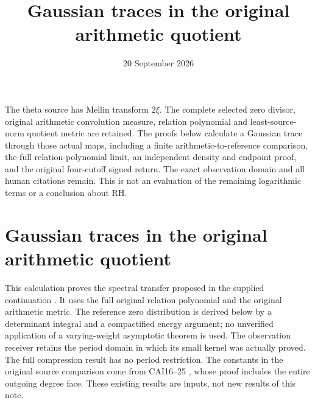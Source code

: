 \documentclass[11pt]{article}
\title{Gaussian traces in the original arithmetic quotient}
\author{}\date{20 September 2026}
\begin{document}
\maketitle
The theta source has Mellin transform $2\xi$. The complete selected
zero divisor, original arithmetic convolution measure, relation
polynomial and least-source-norm quotient metric are retained.
The proofs below calculate a Gaussian trace through those actual
maps, including a finite arithmetic-to-reference comparison,
the full relation-polynomial limit, an independent density and
endpoint proof, and the original four-cutoff signed return.
The exact observation domain and all human citations remain.
This is not an evaluation of the remaining logarithmic terms or
a conclusion about RH.


\clearpage\begingroup
\part*{Gaussian traces in the original arithmetic quotient}
\newcommand{\garnativeR}{\mathbb R}\newcommand{\garnativeC}{\mathbb C}
\newcommand{\garnativePP}{\mathcal P}\newcommand{\garnativedd}{\,d}
\newcommand{\garnativenorm}[1]{\left\lVert#1\right\rVert}
\newcommand{\garnativeTr}{\operatorname{Tr}}\newcommand{\garnativerank}{\operatorname{rank}}
\newtheorem{garnativetheorem}{Theorem}\newtheorem{garnativelemma}[garnativetheorem]{Lemma}


This calculation proves the spectral transfer proposed in the supplied
continuation \cite{garnative:incoming}. It uses the full original relation polynomial
and the original arithmetic metric. The reference zero distribution is
derived below by a determinant integral and a compactified energy argument;
no unverified application of a varying-weight asymptotic theorem is used.
The observation receiver retains the period domain in which its small
kernel was actually proved. The full compression result has no period
restriction. The constants in the original source comparison come from
CAI16--25 \cite{garnative:cumulative}, whose proof includes the entire outgoing degree
face. These existing results are inputs, not new results of this note.
\end{document}
